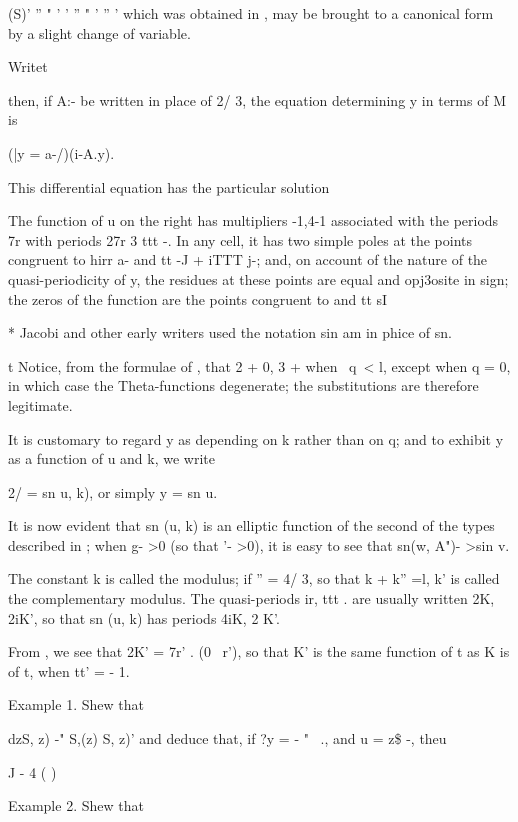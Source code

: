 (S)' '' " ' ' '' " ' '' ' which was obtained in , may be brought
to a canonical form by a slight change of variable.

Writet %

then, if A:- be written in place of 2/ 3, the equation determining y
in terms of M is

(|y = a-/)(i-A.y).

This differential equation has the particular solution

The function of u on the right has multipliers -1,4-1 associated with
the periods 7r%
with periods 27r 3 ttt -. In any cell, it has two simple poles at the
points congruent to hirr a- and tt -J + iTTT j-; and, on account of
the nature of the quasi-periodicity of y, the residues at these points
are equal and opj3osite in sign; the zeros of the function are the
points congruent to and tt sI

* Jacobi and other early writers used the notation sin am in phice of
sn.

t Notice, from the formulae of , that 2 + 0, 3 + when \ q\ < l,
except when q = 0, in which case the Theta-functions degenerate; the
substitutions are therefore legitimate.

%
%

It is customary to regard y as depending on k rather than on q; and
to exhibit y as a function of u and k, we write

2/ = sn u, k), or simply y = sn u.

It is now evident that sn (u, k) is an elliptic function of the second
of the types described in ; when g- >0 (so that '- >0), it is
easy to see that sn(w, A")- >sin v.

The constant k is called the modulus; if '' = 4/ 3, so that k + k''
=l, k' is called the complementary modulus. The quasi-periods ir, ttt
. are usually written 2K, 2iK', so that sn (u, k) has periods 4iK, 2
K'.

From , we see that 2K' = 7r' . (0 \ r'), so that K' is the same
function of t as K is of t, when tt' = - 1.

Example 1. Shew that

dzS, z) -" S,(z) S, z)' and deduce that, if ?y = - " ~., and u = z\$
-, theu

 J - 4 ( )

Example 2. Shew that

